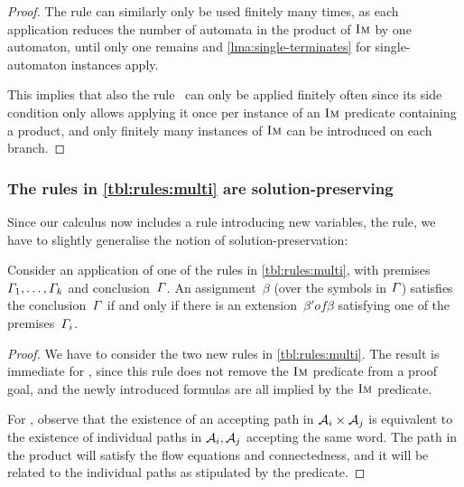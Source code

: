 \begin{proof}
  The rule \Materialise{} can similarly only be used finitely many times, as
  each application reduces the number of automata in the product of $\operatorname{\textsc{Im}}$ by
  one automaton, until only one remains and \cref{lma:single-terminates} for
  single-automaton instances apply.
  
  This implies that also the rule~\ExpandM{} can only be applied
  finitely often since its side condition only allows applying it once
  per instance of an $\operatorname{\textsc{Im}}$ predicate containing a product, and only finitely
  many instances of $\operatorname{\textsc{Im}}$ can be introduced on each branch.
\end{proof}

\subsubsection{The rules in \cref{tbl:rules:multi} are solution-preserving}

Since our calculus now includes a rule introducing new variables, the
\Materialise{} rule, we have to slightly generalise the notion of
solution-preservation:
%
\begin{lemma}\label{lma:multi-correct}
  Consider an application of one of the rules in
  \cref{tbl:rules:multi}, with
  premises~$\varGamma_1, \ldots, \varGamma_k$ and
  conclusion~$\varGamma$. An assignment~$\beta$ (over the symbols in
  $\varGamma$) satisfies the conclusion~$\varGamma$ if and only if
  there is an extension~$\beta' of \beta$ satisfying one of the
  premises~$\varGamma_i$.
\end{lemma}

\begin{proof}
  We have to consider the two new rules in \cref{tbl:rules:multi}. The
  result is immediate for \ExpandM{}, since this rule does not remove the
  $\operatorname{\textsc{Im}}$ predicate from a proof goal, and the newly introduced formulas
  are all implied by the $\operatorname{\textsc{Im}}$ predicate.

  For \Materialise{}, observe that the existence of an accepting path
  in $\mathcal{A}_i \times \mathcal{A}_j$ is equivalent to the existence
  of individual paths in $\mathcal{A}_i, \mathcal{A}_j$ accepting the
  same word. The path in the product will satisfy the flow equations
  and connectedness, and it will be related to the individual paths as
  stipulated by the \BindingSum{} predicate.
\end{proof}

